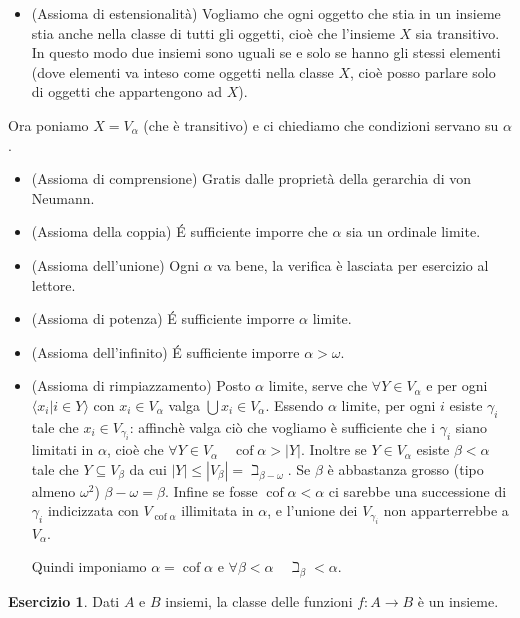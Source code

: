 \documentclass[a4paper,10pt,oneside]{article}
\DeclareMathOperator{\cof}{cof}
\newcommand{\abs}[1]{\left|#1\right|}
\theoremstyle{plain}
\theoremstyle{definition}
\newtheorem{myex}{Esercizio}
\theoremstyle{remark}
\begin{document}
\begin{itemize}
 \item (Assioma di estensionalità) Vogliamo che ogni oggetto che stia in un insieme stia anche nella classe di tutti gli oggetti, cioè che l'insieme $X$ sia transitivo. In questo modo due insiemi sono uguali se e solo se hanno gli stessi elementi (dove elementi va inteso come oggetti nella classe $X$, cioè posso parlare solo di oggetti che appartengono ad $X$).
\end{itemize}
Ora poniamo $X=V_\alpha$ (che è transitivo) e ci chiediamo che condizioni servano su $\alpha$.
\begin{itemize}
 \item (Assioma di comprensione) Gratis dalle proprietà della gerarchia di von Neumann.
 \item (Assioma della coppia) \'E sufficiente imporre che $\alpha$ sia un ordinale limite.
 \item (Assioma dell'unione) Ogni $\alpha$ va bene, la verifica è lasciata per esercizio al lettore.
 \item (Assioma di potenza) \'E sufficiente imporre $\alpha$ limite.
 \item (Assioma dell'infinito) \'E sufficiente imporre $\alpha>\omega$.
 \item (Assioma di rimpiazzamento) Posto $\alpha$ limite, serve che $\forall Y\in V_\alpha$ e per ogni $\langle x_i | i\in Y\rangle$ con $x_i \in V_\alpha$ valga $\bigcup x_i\in V_\alpha$. Essendo $\alpha$ limite, per ogni $i$ esiste $\gamma_i$ tale che $x_i\in V_{\gamma_i}$: affinchè valga ciò che vogliamo è sufficiente che i $\gamma_i$ siano limitati in $\alpha$, cioè che $\forall Y\in V_\alpha \quad \cof\alpha>\abs{Y}$. Inoltre se $Y\in V_\alpha$ esiste $\beta<\alpha$ tale che $Y\subseteq V_\beta$ da cui $\abs{Y}\le\abs{V_\beta}=\beth_{\beta-\omega}$. Se $\beta$ è abbastanza grosso (tipo almeno $\omega^2$) $\beta-\omega=\beta$. Infine se fosse $\cof\alpha<\alpha$ ci sarebbe una successione di $\gamma_i$ indicizzata con $V_{\cof\alpha}$ illimitata in $\alpha$, e l'unione dei $V_{\gamma_i}$ non apparterrebbe a $V_\alpha$.

Quindi imponiamo $\alpha=\cof\alpha$ e $\forall\beta<\alpha\quad\beth_\beta<\alpha$.
\end{itemize}

\begin{myex}
 Dati $A$ e $B$ insiemi, la classe delle funzioni $f: A\rightarrow B$ è un insieme.
\end{myex}
\end{document}
